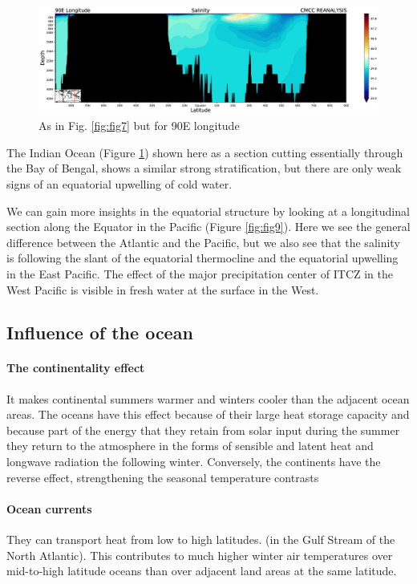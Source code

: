 \begin{figure}[htpb!]
	\centering
	\includegraphics[width = 0.4 \textwidth]{upload/33image.png}
	\caption{As in Fig. \ref{fig:fig7} but for 90E longitude}
	\label{fig: fig8}
\end{figure}

The Indian Ocean (Figure \ref{fig: fig8}) shown here as a section
cutting essentially through the Bay of Bengal, shows a similar strong
stratification, but there are only weak signs of an equatorial upwelling
of cold water.



We can gain more insights in the equatorial structure by looking at a
longitudinal section along the Equator in the Pacific (Figure \ref{fig:fig9}). Here we see the general difference between the
Atlantic and the Pacific, but we also see that the salinity is following
the slant of the equatorial thermocline and the equatorial upwelling in
the East Pacific. The effect of the major precipitation center of ITCZ
in the West Pacific is visible in fresh water at the surface in the
West.

\subsection{Influence of the ocean}

\paragraph{The continentality effect}
It makes continental summers warmer and winters cooler than the adjacent ocean areas. The oceans have this effect because of their large heat storage capacity and because part of  the energy that they retain from solar input during the summer they return to the atmosphere in the forms of sensible and latent heat and longwave radiation the following winter. Conversely, the continents have the reverse effect, strengthening the seasonal temperature contrasts

\paragraph{Ocean currents}
They can transport heat from low to high latitudes. (in the Gulf Stream of the North Atlantic). This contributes to much higher winter air temperatures over mid-to-high latitude oceans than over adjacent land areas at the same latitude.

